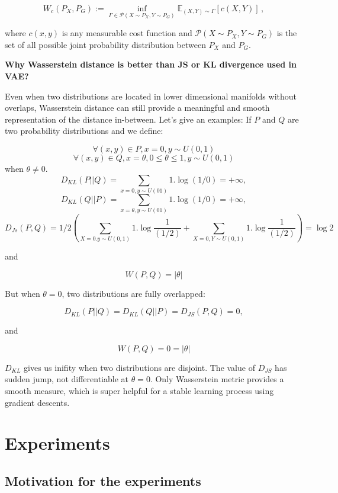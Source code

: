 \documentclass[12pt,english]{amsart}
\theoremstyle{definition}
\begin{document}
\begin{equation}
\label{eq:ot}
W_c(P_X,P_G):=\inf_{\Gamma\in \mathcal{P}(X\sim P_X,Y\sim P_G)} \mathbb{E}_{(X,Y)\sim\Gamma}[c(X,Y)]\,,
\end{equation}

where $c(x,y)$ is any measurable cost function and
$\mathcal{P}(X\sim P_X,Y\sim P_G)$ is the set of all possible joint probability
distribution between $P_X$ and $P_G$.

\textbf{Why Wasserstein distance is better than JS or KL divergence used in VAE?}

Even when two distributions are located in lower dimensional manifolds without
overlaps, Wasserstein distance can still provide a meaningful and smooth
representation of the distance in-between. Let's give an examples: If $P$ and
$Q$ are two probability distributions and we define:

$$\forall (x,y) \in P, x=0 , y\sim U(0,1)$$
$$\forall (x,y) \in Q, x=\theta, 0\leq \theta \leq 1, y\sim U(0,1)$$
when $\theta \not=0$.\\
$$D_{KL}(P||Q)= \sum _{x=0, y \sim U(01)} 1. \log(1/0)= +\infty,$$
$$D_{KL}(Q||P)= \sum _{x=\theta, y \sim U(01)} 1. \log(1/0)= +\infty,$$
$$D_{Js} (P,Q)= 1/2 \left( \sum_{X=0. y \sim U(0,1)}1. \log \frac{1}{(1/2)}+ \sum_{X=0, Y\sim U(0,1)}1. \log \frac{1}{(1/2)}\right)= \log 2$$

and

$$W(P,Q)= |\theta|$$

But when $\theta=0$, two distributions are fully overlapped:

$$D_{KL}(P||Q)= D_{KL}(Q||P)= D_{JS}(P,Q)=0,$$

and

$$W(P,Q)=0=|\theta|$$

$D_{KL}$ gives us inifity when two distributions are disjoint. The value of
$D_{JS}$ has sudden jump, not differentiable at $\theta=0$. Only Wasserstein
metric provides a smooth measure, which is super helpful for a stable learning
process using gradient descents.

\section{Experiments}

\subsection{Motivation for the experiments}
\end{document}
